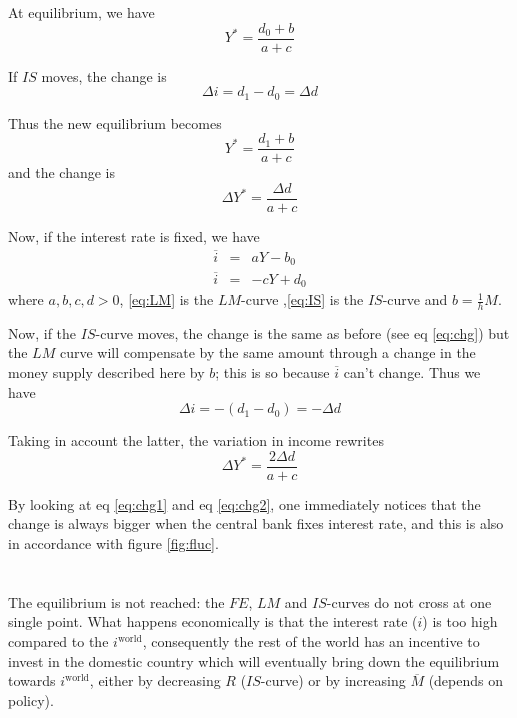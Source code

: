 \documentclass[a4paper] {scrartcl}
\begin{document}
At equilibrium, we have
\begin{equation}
	Y^* = \frac{d_0+b}{a+c}
\end{equation}

If $IS$ moves, the change is 
\begin{equation}
	\label{eq:chg}
	\Delta i = d_1 - d_0 = \Delta d
\end{equation}

Thus the new equilibrium becomes
\begin{equation}
	Y^* = \frac{d_1+b}{a+c}
\end{equation}
and the change is
\begin{equation}
	\label{eq:chg1}
	\Delta Y^* = \frac{\Delta d}{a+c}
\end{equation}

Now, if the interest rate is fixed, we have 
\begin{eqnarray}
	\overline i&=& 
	aY  -b_0\label{eq:LM}\\
	\overline i&=& -cY+d_0\label{eq:IS}
\end{eqnarray}
where $a,b,c,d>0$, \ref{eq:LM} is the $LM$-curve
,\ref{eq:IS} is the $IS$-curve and $b=\frac{1}{h}M$.

Now, if the $IS$-curve moves, the change is the same as before (see eq \ref{eq:chg}) but the $LM$ curve will compensate by the same amount through a change in the money supply described here by $b$; this is so because $\overline i$ can't change. Thus we have
\begin{equation}
	\Delta i = -(d_1-d_0)=-\Delta d
\end{equation}



Taking in account the latter, the variation in income rewrites
\begin{equation}
	\label{eq:chg2}
	\Delta Y^* = \frac{2\Delta d}{a+c}
\end{equation}

By looking at eq \ref{eq:chg1} and eq \ref{eq:chg2}, one immediately notices that the change is always bigger when the central bank fixes interest rate, and this is also in accordance with figure \ref{fig:fluc}.


\section{ }
\subsection{ }
The equilibrium is not reached: the $FE$, $LM$ and $IS$-curves do not cross at one single point. What happens economically is that the interest rate ($i$) is too high compared to the $i^{\text{world}}$, consequently the rest of the world has an incentive to invest in the domestic country which will eventually bring down the equilibrium towards $i^{\text{world}}$, either by decreasing $R$ ($IS$-curve) or by increasing $\overline M$ (depends on policy).
\end{document}
